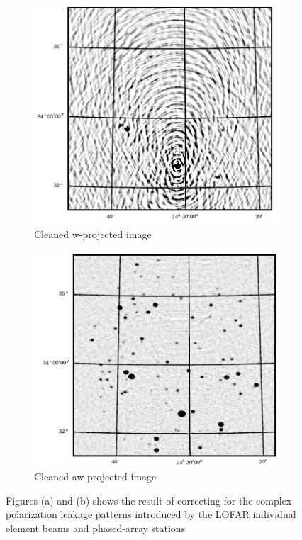 \begin{figure}[h]
 \centering
 \begin{subfigure}[b]{0.35\textwidth}
  \includegraphics[width=\textwidth]{images/lofar_no_dd.png}
  \caption{Cleaned w-projected image}
 \end{subfigure}
 \begin{subfigure}[b]{0.35\textwidth}
  \includegraphics[width=\textwidth]{images/lofar_dd.png}
  \caption{Cleaned aw-projected image}
 \end{subfigure}
 \caption[A-projection results on LOFAR]{Figures (a) and (b) shows the result of correcting for the complex polarization leakage patterns
 introduced by the LOFAR individual element beams and phased-array stations}
 \label{fig_aprojection_lofar}
\end{figure}

